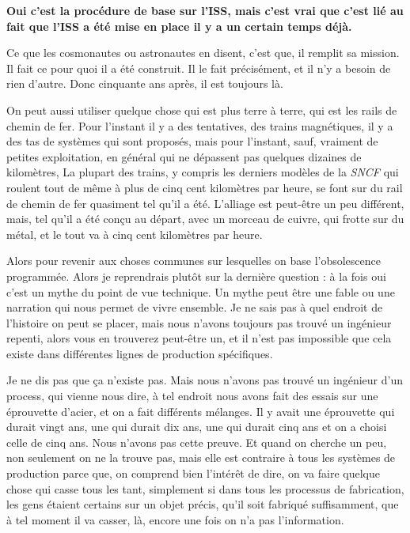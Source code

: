 \begin{small}
\textbf{Oui c'est la procédure de base sur l'ISS, mais c'est vrai que c'est lié au fait que l'ISS a été mise en place il y a un certain temps déjà.}

\vspace{1\baselineskip}

Ce que les cosmonautes ou astronautes en disent, c'est que, il remplit sa mission. Il fait ce pour quoi il a été construit. Il le fait précisément, et il n'y a besoin de rien d'autre. Donc cinquante ans après, il est toujours là. 

On peut aussi utiliser quelque chose qui est plus terre à terre, qui est les rails de chemin de fer. Pour l'instant il y a des tentatives, des trains magnétiques, il y a des tas de systèmes qui sont proposés, mais pour l'instant, sauf, vraiment de petites exploitation, en général qui ne dépassent pas quelques dizaines de kilomètres, La plupart des trains, y compris les derniers modèles de la \textit{SNCF} qui roulent tout de même à plus de cinq cent kilomètres par heure, se font sur du rail de chemin de fer quasiment tel qu'il a été. L'alliage est peut-être un peu différent, mais, tel qu'il a été conçu au départ, avec un morceau de cuivre, qui frotte sur du métal, et le tout va à  cinq cent kilomètres par heure. 

\smallbreak
Alors pour revenir aux choses communes sur lesquelles on base l'obsolescence programmée. Alors je reprendrais plutôt sur la dernière question : à la fois oui c'est un mythe du point de vue technique. Un mythe peut être une fable ou une narration qui nous permet de vivre ensemble. Je ne sais pas à quel endroit de l'histoire on peut se placer, mais nous n'avons toujours pas trouvé un ingénieur repenti, alors vous en trouverez peut-être un, et il n'est pas impossible que cela existe dans différentes lignes de production spécifiques. 

Je ne dis pas que ça n'existe pas. Mais nous n'avons pas trouvé un ingénieur d'un process, qui vienne nous dire, à tel endroit nous avons fait des essais sur une éprouvette d'acier, et on a fait différents mélanges. Il y avait une éprouvette qui durait vingt ans, une qui durait dix ans, une qui durait cinq ans et on a choisi celle de cinq ans. Nous n'avons pas cette  preuve. Et quand on cherche un peu, non seulement on ne la trouve pas, mais elle est contraire à tous les systèmes de production parce que, on comprend bien l’intérêt de dire, on va faire quelque chose qui casse tous les tant, simplement si dans tous les processus de fabrication, les gens étaient certains sur un objet précis, qu'il soit fabriqué suffisamment, que à tel moment il va casser, là, encore une fois on n'a pas l'information.


\end{small}
